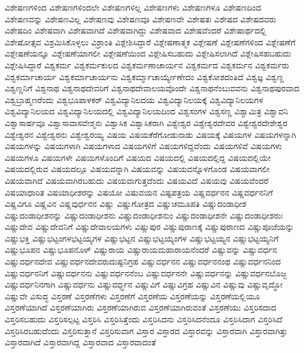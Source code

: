 {ವಿಶೇಷಣಗಳಿಂದ
ವಿಶೇಷಣಗಳಿಂದಲೇ
ವಿಶೇಷಣಗಳಿಲ್ಲ
ವಿಶೇಷಣಗಳು
ವಿಶೇಷಣಗಳೂ
ವಿಶೇಷಣದಿಂದ
ವಿಶೇಷಣವನ್ನು
ವಿಶೇಷಣವಿಲ್ಲ
ವಿಶೇಷಣವು
ವಿಶೇಷಣವೂ
ವಿಶೇಷಣವೇ
ವಿಶೇಷತಃ
ವಿಶೇಷದ
ವಿಶೇಷದವರು
ವಿಶೇಷದಿಂ
ವಿಶೇಷವಾಗಿ
ವಿಶೇಷವಾಗಿದೆ
ವಿಶೇಷವಾಗಿದ್ದು
ವಿಶೇಷವಾದ
ವಿಶೇಷವೆಂದರೆ
ವಿಶೇಷಾರ್ಥದಲ್ಲಿ
ವಿಶೇಷೋತ್ಸವ
ವಿಶ್ರಮಿಸಿಕೊಳ್ಳಲು
ವಿಶ್ರಾಂತಿ
ವಿಶ್ಲೇಶಿಸಿದ್ದಾರೆ
ವಿಶ್ಲೇಷಣಾತ್ಮಕ
ವಿಶ್ಲೇಷಣೆ
ವಿಶ್ಲೇಷಣೆಗಳಿಂದ
ವಿಶ್ಲೇಷಣೆಗೆ
ವಿಶ್ಲೇಷಣೆಯನ್ನೂ
ವಿಶ್ಲೇಷಣೆಯಾಗಲೀ
ವಿಶ್ಲೇಷಣೆಯಿಂದ
ವಿಶ್ಲೇಷಿಸಬಹುದು
ವಿಶ್ಲೇಷಿಸಲಾಗಿದೆ
ವಿಶ್ಲೇಷಿಸಹಬಹುದು
ವಿಶ್ಲೇಷಿಸಿದ್ದಾರೆ
ವಿಶ್ವಕರ್ಮ
ವಿಶ್ವಕರ್ಮಕುಲದ
ವಿಶ್ವಕರ್ಮಣಾಚಾರ್ಯನ
ವಿಶ್ವಕರ್ಮದ
ವಿಶ್ವಕರ್ಮನ
ವಿಶ್ವಕರ್ಮರು
ವಿಶ್ವಕರ್ಮಾಚಾರ್ಯ
ವಿಶ್ವಕರ್ಮಾಚಾರ್ಯನು
ವಿಶ್ವಕರ್ಮ್ಮಾಚಾರ್ಯ್ಯೇಣೇದಂ
ವಿಶ್ವಕೋಶದಂತಿದೆ
ವಿಶ್ವಜ್ಞ
ವಿಶ್ವಣ್ಣ
ವಿಶ್ವಣ್ಣನಿಗೆ
ವಿಶ್ವನಾಥ
ವಿಶ್ವನಾಥದೇವರಿಗೆ
ವಿಶ್ವನಾಥದೇವಾಲಯವೊಂದೇ
ವಿಶ್ವನಾಥನೆಂಬುವವನು
ವಿಶ್ವನಾಥಪುರವಾದ
ವಿಶ್ವಬ್ರಾಹ್ಮಣರೆಂದು
ವಿಶ್ವಭೂಪಾಳಕರ್
ವಿಶ್ವವಿದ್ಯಾನಿಲದಯ
ವಿಶ್ವವಿದ್ಯಾನಿಲಯಕ್ಕೆ
ವಿಶ್ವವಿದ್ಯಾನಿಲಯಗಳ
ವಿಶ್ವವಿದ್ಯಾನಿಲಯದ
ವಿಶ್ವವಿದ್ಯಾನಿಲಯದಲ್ಲಿ
ವಿಶ್ವವಿದ್ಯಾನಿಲಯದಿಂದ
ವಿಶ್ವಸಂಗಳ
ವಿಶ್ವಸಣ್ಣ
ವಿಶ್ವಾಮಿತ್ರ
ವಿಶ್ವಾವನಿ
ವಿಶ್ವಾಸಾರ್ಹವೂ
ವಿಶ್ವಾಸಾವಾಸವೇಶ್ಮನಃ
ವಿಶ್ವಾಸಿಕ
ವಿಶ್ವಾಸಿಕರಾಗಿ
ವಿಶ್ವೇಶ್ವರ
ವಿಶ್ವೇಶ್ವರದೇವರ
ವಿಶ್ವೇಶ್ವರದೇಶೇಶ್ವರ
ವಿಶ್ವೇಶ್ವರನ
ವಿಶ್ವೇಶ್ವರನು
ವಿಶ್ವೇಶ್ವರಯ್ಯ
ವಿಷಯ
ವಿಷಯಕೆರೆಗೋಡುನಾಡು
ವಿಷಯಕ್ಕೆ
ವಿಷಯಗಳ
ವಿಷಯಗಳನ್ನಾಗಿ
ವಿಷಯಗಳನ್ನು
ವಿಷಯಗಳಾಗಿ
ವಿಷಯಗಳಾದ
ವಿಷಯಗಳಿಗೆ
ವಿಷಯಗಳಿದ್ದವೆಂದು
ವಿಷಯಗಳಿವೆ
ವಿಷಯಗಳು
ವಿಷಯಗಳೂ
ವಿಷಯಗಳೇ
ವಿಷಯಗಳೊಂದಿಗೆ
ವಿಷಯದ
ವಿಷಯದಲ್ಲಿ
ವಿಷಯದಲ್ಲಿದ್ದ
ವಿಷಯದಲ್ಲಿಯೇ
ವಿಷಯದಲ್ಲಿರುವ
ವಿಷಯದಲ್ಲೂ
ವಿಷಯವನ್ನಾಗಿ
ವಿಷಯವನ್ನು
ವಿಷಯವನ್ನೊಳಗೊಂಡ
ವಿಷಯವಾಗಲೀ
ವಿಷಯವಾಗಿದೆ
ವಿಷಯವಾಗಿರಬಹುದು
ವಿಷಯವಾಗುತ್ತದೆಂದು
ವಿಷಯವಿದೆ
ವಿಷಯವು
ವಿಷಯವೆಂದರೆ
ವಿಷಯಾಧಾರಿತ
ವಿಷಯಾಧೀಶರನ್ನು
ವಿಷಯೋ
ವಿಷುವಯನ
ವಿಷ್ಟಪತ್ರಯ
ವಿಷ್ಣವರ್ಧನನ
ವಿಷ್ಣವರ್ಧನನಿಗೆ
ವಿಷ್ಣವಿಗೂ
ವಿಷ್ಣವಿನ
ವಿಷ್ಣವುರ್ಧನನ
ವಿಷ್ಣು
ವಿಷ್ಣುಗೋತ್ರದ
ವಿಷ್ಣುಚಮೂಪತಿ
ವಿಷ್ಣುದಂಡಾಧೀಶ
ವಿಷ್ಣುದಂಡಾಧೀಶನನ್ನು
ವಿಷ್ಣುದಂಡಾಧೀಶನು
ವಿಷ್ಣುದಂಡಾಧೀಶನುಂ
ವಿಷ್ಣುದಂಡಾಧೀಶನೇ
ವಿಷ್ಣುದಂಡಾಧೀಶರುಃ
ವಿಷ್ಣುದೇವ
ವಿಷ್ಣುದೇವನಿಗೆ
ವಿಷ್ಣುದೇವಾಲಯಗಳು
ವಿಷ್ಣುಪುರ
ವಿಷ್ಣುಪುರಾಣಕ್ಕೆ
ವಿಷ್ಣುಪುರಾಣದ
ವಿಷ್ಣುಪೂಜೆಯನ್ನು
ವಿಷ್ಣುಭಕ್ತಿ
ವಿಷ್ಣುಭಟ್ಟಂಗಳಭಟ್ಟಯ್ಯಗಳ
ವಿಷ್ಣುಭಟ್ಟನ
ವಿಷ್ಣುಭಟ್ಟಯ್ಯಂಗಳ
ವಿಷ್ಣುಭಟ್ಟಯ್ಯನ
ವಿಷ್ಣುಭಟ್ಟಯ್ಯನಿಗೆ
ವಿಷ್ಣುಭೂಪನ
ವಿಷ್ಣುಭೂಪನೊಳ್
ವಿಷ್ಣುರಾಯ
ವಿಷ್ಣುರಾಯಮಹಾರಾಯನೆಂದರೆ
ವಿಷ್ಣುವನ್ನು
ವಿಷ್ಣುವರ್ಧನ
ವಿಷ್ಣುವರ್ಧನದೇವ
ವಿಷ್ಣುವರ್ಧನದೇವರುದುಷ್ಟನಿಗ್ರಹ
ವಿಷ್ಣುವರ್ಧನನ
ವಿಷ್ಣುವರ್ಧನನಂಥ
ವಿಷ್ಣುವರ್ಧನನಿಂದ
ವಿಷ್ಣುವರ್ಧನನಿಗೆ
ವಿಷ್ಣುವರ್ಧನನು
ವಿಷ್ಣುವರ್ಧನನೆಂಬ
ವಿಷ್ಣುವರ್ಧನನೇ
ವಿಷ್ಣುವರ್ಧನನ್ನು
ವಿಷ್ಣುವರ್ಧನಬೊಜ್ಜ
ವಿಷ್ಣುವರ್ಧನಿನಗಾಗಿ
ವಿಷ್ಣುವರ್ಧನು
ವಿಷ್ಣುವರ್ಧ್ಧನ
ವಿಷ್ಣುವಿಗೆ
ವಿಷ್ಣುವಿಗ್ರಹ
ವಿಷ್ಣುವಿನ
ವಿಷ್ಣುವು
ವಿಷ್ಣುವೃದ್ಧೋ
ವಿಷ್ಣುವೇ
ವಿಸುದ್ಧ
ವಿಸ್ತರಣೆ
ವಿಸ್ತರಣೆಗಳು
ವಿಸ್ತರಣೆಗೆ
ವಿಸ್ತರಣೆಯ
ವಿಸ್ತರಣೆಯನ್ನು
ವಿಸ್ತರಣೆಯಲ್ಲಿಯೂ
ವಿಸ್ತರಣೆಯಾಗಿದೆ
ವಿಸ್ತರಣೆಯಾಗಿರು
ವಿಸ್ತರಣೆಯಾಗಿರುವ
ವಿಸ್ತರಣೆಯಾಗಿರುವಂತೆ
ವಿಸ್ತರಣೆಯು
ವಿಸ್ತರಿಸದಾದ
ವಿಸ್ತರಿಸಬಹುದು
ವಿಸ್ತರಿಸಲ್ಪಟ್ಟ
ವಿಸ್ತರಿಸಿ
ವಿಸ್ತರಿಸಿತ್ತೆಂದು
ವಿಸ್ತರಿಸಿದನು
ವಿಸ್ತರಿಸಿದನೆಂದೂ
ವಿಸ್ತರಿಸಿದಾಗ
ವಿಸ್ತರಿಸಿದೆ
ವಿಸ್ತರಿಸಿರಬಹುದೆಂದು
ವಿಸ್ತರಿಸುತ್ತಾನೆ
ವಿಸ್ತರಿಸುವಾಗ
ವಿಸ್ತಾರ
ವಿಸ್ತಾರದ
ವಿಸ್ತಾರವನ್ನು
ವಿಸ್ತಾರವಾಗಿ
ವಿಸ್ತಾರವಾಗಿತ್ತು
ವಿಸ್ತಾರವಾಗಿದೆ
ವಿಸ್ತಾರವಾಗಿದ್ದ
ವಿಸ್ತಾರವಾದ
ವಿಸ್ತಾರವಾದಂತೆ
}
